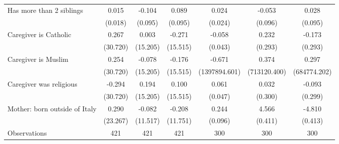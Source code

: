 {\begin{tabular}{l*{6}{c}}
\addlinespace
Has more than 2 siblings&       0.015         &      -0.104         &       0.089         &       0.024         &      -0.053         &       0.028         \\
                    &     (0.018)         &     (0.095)         &     (0.095)         &     (0.024)         &     (0.096)         &     (0.095)         \\
\addlinespace
Caregiver is Catholic&       0.267         &       0.003         &      -0.271         &      -0.058         &       0.232         &      -0.173         \\
                    &    (30.720)         &    (15.205)         &    (15.515)         &     (0.043)         &     (0.293)         &     (0.293)         \\
\addlinespace
Caregiver is Muslim&       0.254         &      -0.078         &      -0.176         &      -0.671         &       0.374         &       0.297         \\
                    &    (30.720)         &    (15.205)         &    (15.515)         &(1397894.601)         &(713120.400)         &(684774.202)         \\
\addlinespace
Caregiver was religious&      -0.294         &       0.194         &       0.100         &       0.061         &       0.032         &      -0.093         \\
                    &    (30.720)         &    (15.205)         &    (15.515)         &     (0.047)         &     (0.300)         &     (0.299)         \\
\addlinespace
Mother: born outside of Italy&       0.290         &      -0.082         &      -0.208         &       0.244\sym{*}  &       4.566\sym{***}&      -4.810\sym{***}\\
                    &    (23.267)         &    (11.517)         &    (11.751)         &     (0.096)         &     (0.411)         &     (0.413)         \\
\midrule
Observations        &         421         &         421         &         421         &         300         &         300         &         300         \\
\bottomrule
\end{tabular}
}
